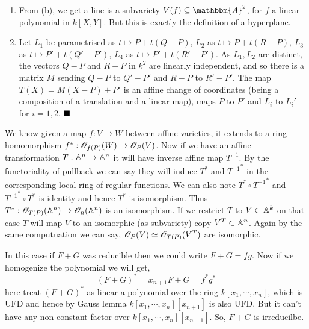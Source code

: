 \documentclass[12pt]{article}
\begin{document}
\begin{enumerate}[label = (\alph*)]
    \item From (b), we get a line is a subvariety \( V(f) \subseteq \mathbbm{A}^2 \), for \( f \) a linear polynomial in \( k[X,Y] \). But this is exactly the definition of a hyperplane.
          \smallskip

    \item Let \( L_1 \) be parametrised as \( t \mapsto P + t(Q-P) \), \( L_2 \) as \( t \mapsto P + t(R-P) \), \( L_3 \) as \( t \mapsto P' + t(Q'-P') \), \( L_4 \) as \( t \mapsto P' + t(R'-P')\). As \( L_1,L_2 \) are distinct, the vectors \( Q-P \) and \( R-P \) in \( k^2 \) are linearly independent, and so there is a matrix \( M \) sending \( Q-P \) to \( Q'-P' \) and \( R-P \) to \( R'-P' \). The map \( T(X) = M(X-P) + P' \) is an affine change of coordinates (being a composition of a translation and a linear map), maps \( P \) to \( P' \) and \( L_i \) to \( L_i' \) for \( i=1,2 \). \(\hfill \blacksquare\)
\end{enumerate}

\textcolor{maroon}{} We know given a map $f : V \to W$ between affine varieties, it extends to a ring homomorphism $f^{\ast}: \mathscr{O}_{f(P)}(W) \to \mathscr{O}_{P}(V)$. Now if we have an affine transformation $T : \mathbb{A}^n \to \mathbb{A}^n$ it will have inverse affine map $T^{-1}$. By the functoriality of pullback we can say they will induce $T^{\ast}$ and ${T^{-1}}^{\ast}$ in the corresponding local ring of regular functions. We can also note $T^{\ast} \circ {T^{-1}}^{\ast}$ and ${T^{-1}}^{\ast} \circ T^{\ast}$ is identity and hence $T^{\ast}$ is isomorphism. Thus $T^{\ast}: \mathscr{O}_{T(P)}(\mathbb{A}^n) \to \mathscr{O}_n(\mathbb{A}^n)$ is an isomorphism. If we restrict $T$ to $V \subset \mathbb{A}^k$ on that case $T$ will map $V$ to an isomorphic (as subvariety) copy $V^T\subset \mathbb{A}^n$. Again by the same computuation we can say, $\mathscr{O}_{P}(V) \simeq \mathscr{O}_{T(P)}(V^T)$ are isomorphic.

\vspace*{0.2cm}

\noindent  \textcolor{maroon}{} In this case if $F+G$ was reducible then we could write $F+G = fg$. Now if we homogenize the polynomial we will get, $$(F+G)^{\ast} = x_{n+1}F+G = f^{\ast} g^{\ast}$$ here treat $(F+G)^{\ast}$ as linear a polynomial over the ring $k[x_1,\cdots,x_n]$, which is UFD and hence by Gauss lemma $k[x_1,\cdots,x_n][x_{n+1}]$ is also UFD. But it can't have any non-constant factor over $k[x_1,\cdots,x_n][x_{n+1}]$. So, $F+G$ is irreducilbe.

\vspace*{0.2cm}
\end{document}
